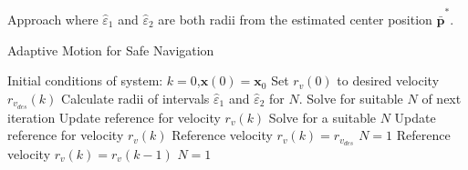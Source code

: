 \begin{section}{Approach}
where $\hat{\varepsilon}_1$ and $\hat{\varepsilon}_2$ are both radii from the estimated center position $\hat{\bar{\bm{p}}}^*$.
	


\begin{algorithm}
   \caption{Adaptive Motion for Safe Navigation} 
   \label{alg:adapt_motion} 
    \begin{algorithmic}[1]
	\State Initial conditions of system: $k=0$,$\bm{x}(0)=\bm{x}_0$
	\State Set $r_v(0)$ to desired velocity $r_{v_{des}}(k)$
        \State {}
        \State Calculate radii of intervals $\hat{\varepsilon}_1$ and $\hat{\varepsilon}_2$ for $N$.
            \State Solve for suitable $N$ of next iteration
            \State Update reference for velocity $r_v(k)$
        \Else
                \State Solve for a suitable $N$
                \State Update reference for velocity $r_v(k)$
            \Else
                    \State Reference velocity $r_v(k)=r_{v_{des}}$
                    \State $N = 1$
                \Else
                    \State Reference velocity $r_v(k) = r_v(k-1)$
                    \State $N = 1$
                \EndIf
            \EndIf
        \EndIf
    \EndWhile
	\end{algorithmic}
\end{algorithm}



\end{section} 